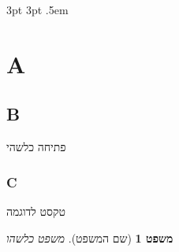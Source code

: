 

\usepackage{sectsty, xcolor}


\newcommand\maincolor{teal}

\allsectionsfont{\color{\maincolor}}

	{3pt}	%
	{3pt}	%
	{\itshape}%
	{}	%
	{\bfseries}	%
	{}	%
	{.5em}	%
	{\color{\maincolor}}	%

\theoremstyle{c2_plain}
\newtheorem{theorem2}{משפט}[section]




\section{A}
\subsection{B}
פתיחה כלשהי

\subsubsection{C}
טקסט לדוגמה
\begin{theorem2}[שם המשפט]
	משפט כלשהו
\end{theorem2}


